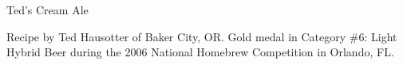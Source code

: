 \documentclass[parskip=half,fontsize=9pt,oneside]{scrbook}
\begin{document}
\mainmatter


\begin{recipe}{Ted's Cream Ale}

\begin{aboutblock}
Recipe by Ted Hausotter of Baker City, OR. Gold medal in Category \#6: Light
Hybrid Beer during the 2006 National Homebrew Competition in Orlando, FL.
\sourceaha
\end{aboutblock}


\begin{methodandtiming}

\begin{mashsteps}
\end{mashsteps}

\begin{fermentationsteps}
\end{fermentationsteps}

\end{methodandtiming}

\recipebreak

\begin{ingredientsblock}

\begin{malts}
\end{malts}

\begin{hops}
\end{hops}


\end{ingredientsblock}

\end{recipe}


\end{document}

